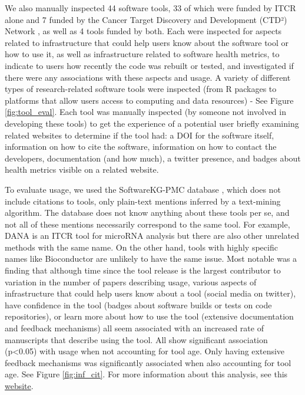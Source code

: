 \documentclass{article}
\begin{document}
We also manually inspected 44 software tools, 33 of which were funded by ITCR alone and 7 funded by the Cancer Target Discovery and Development (CTD²) Network \cite{aksoy_ctd2_2017}, as well as 4 tools funded by both.  Each were inspected for aspects related to infrastructure that could help users know about the software tool or how to use it, as well as infrastructure related to software health metrics, to indicate to users how recently the code was rebuilt or tested, and investigated if there were any associations with these aspects and usage.  A variety of different types of research-related software tools were inspected (from R packages to platforms that allow users access to computing and data resources) - See Figure \ref{fig:tool_eval}. Each tool was manually inspected (by someone not involved in developing these tools) to get the experience of a potential user briefly examining related websites to determine if the tool had: a DOI for the software itself, information on how to cite the software, information on how to contact the developers, documentation (and how much), a twitter presence, and badges about health metrics visible on a related website.

To evaluate usage, we used the SoftwareKG-PMC database \cite{Kruger_usage_20}, which does not include citations to tools, only plain-text mentions inferred by a text-mining algorithm. The database does not know anything about these tools per se, and not all of these mentions necessarily correspond to the same tool. For example, DANA is an ITCR tool for microRNA analysis but there are also other unrelated methods with the same name. On the other hand, tools with highly specific names like Bioconductor are unlikely to have the same issue. Most notable was a finding that although time since the tool release is the largest contributor to variation in the number of papers describing usage, various aspects of infrastructure that could help users know about a tool (social media on twitter), have confidence in the tool (badges about software builds or tests on code repositories), or learn more about how to use the tool (extensive documentation and feedback mechanisms) all seem associated with an increased rate of manuscripts that describe using the tool. All show significant association (p<0.05) with usage when not accounting for tool age. Only having extensive feedback mechanisms was significantly associated when also accounting for tool age. See Figure \ref{fig:inf_cit}. For more information about this analysis, see this \href{https://hutchdatascience.org/ITCR_Metrics_manuscript_website/}{website}.
\end{document}
